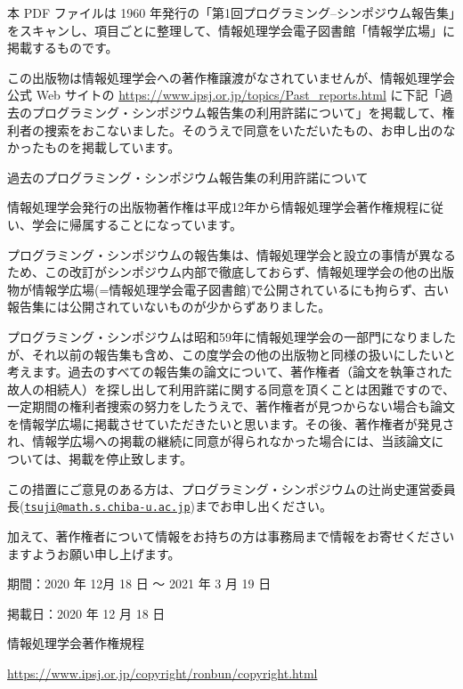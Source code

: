 \documentclass[a5j]{jsarticle}
\begin{document}
\small

本 PDF ファイルは 1960 年発行の「第1回プログラミング–シンポジウム報告集」をスキャンし、項目ごとに整理して、情報処理学会電子図書館「情報学広場」に掲載するものです。

\medskip

この出版物は情報処理学会への著作権譲渡がなされていませんが、情報処理学会公式 Web サイトの \url{https://www.ipsj.or.jp/topics/Past_reports.html} に下記「過去のプログラミング・シンポジウム報告集の利用許諾について」を掲載して、権利者の捜索をおこないました。そのうえで同意をいただいたもの、お申し出のなかったものを掲載しています。

\bigskip

\begin{itembox}[l]{過去のプログラミング・シンポジウム報告集の利用許諾について}

情報処理学会発行の出版物著作権は平成12年から情報処理学会著作権規程に従い、学会に帰属することになっています。

\medskip

プログラミング・シンポジウムの報告集は、情報処理学会と設立の事情が異なるため、この改訂がシンポジウム内部で徹底しておらず、情報処理学会の他の出版物が情報学広場(=情報処理学会電子図書館)で公開されているにも拘らず、古い報告集には公開されていないものが少からずありました。

\medskip

プログラミング・シンポジウムは昭和59年に情報処理学会の一部門になりましたが、それ以前の報告集も含め、この度学会の他の出版物と同様の扱いにしたいと考えます。過去のすべての報告集の論文について、著作権者（論文を執筆された故人の相続人）を探し出して利用許諾に関する同意を頂くことは困難ですので、一定期間の権利者捜索の努力をしたうえで、著作権者が見つからない場合も論文を情報学広場に掲載させていただきたいと思います。その後、著作権者が発見され、情報学広場への掲載の継続に同意が得られなかった場合には、当該論文については、掲載を停止致します。

\medskip

この措置にご意見のある方は、プログラミング・シンポジウムの辻尚史運営委員長(\href{mailto:tsuji@math.s.chiba-u.ac.jp}{\nolinkurl{tsuji@math.s.chiba-u.ac.jp}})までお申し出ください。

\medskip

加えて、著作権者について情報をお持ちの方は事務局まで情報をお寄せくださいますようお願い申し上げます。

\medskip

\begin{description}
\item 期間：2020 年 12月 18 日 ～ 2021 年 3 月 19 日
\item 掲載日：2020 年 12 月 18 日
\end{description}

\medskip


\medskip

\begin{description}
\item 情報処理学会著作権規程
\item \url{https://www.ipsj.or.jp/copyright/ronbun/copyright.html}
\end{description}

\medskip

\end{itembox}
\end{document}
